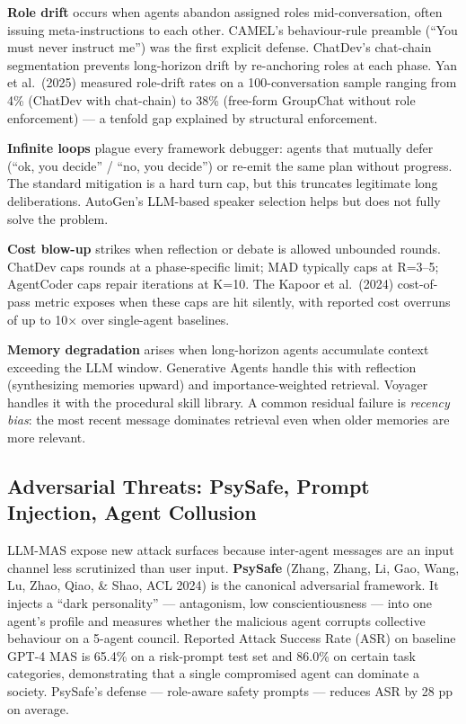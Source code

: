 \textbf{Role drift} occurs when agents abandon assigned roles mid-conversation, often issuing meta-instructions to each other. CAMEL's behaviour-rule preamble (``You must never instruct me'') was the first explicit defense. ChatDev's chat-chain segmentation prevents long-horizon drift by re-anchoring roles at each phase. Yan et al.~(2025) measured role-drift rates on a 100-conversation sample ranging from 4\% (ChatDev with chat-chain) to 38\% (free-form GroupChat without role enforcement) --- a tenfold gap explained by structural enforcement.

\textbf{Infinite loops} plague every framework debugger: agents that mutually defer (``ok, you decide'' / ``no, you decide'') or re-emit the same plan without progress. The standard mitigation is a hard turn cap, but this truncates legitimate long deliberations. AutoGen's LLM-based speaker selection helps but does not fully solve the problem.

\textbf{Cost blow-up} strikes when reflection or debate is allowed unbounded rounds. ChatDev caps rounds at a phase-specific limit; MAD typically caps at R=3--5; AgentCoder caps repair iterations at K=10. The Kapoor et al.~(2024) cost-of-pass metric exposes when these caps are hit silently, with reported cost overruns of up to 10× over single-agent baselines.

\textbf{Memory degradation} arises when long-horizon agents accumulate context exceeding the LLM window. Generative Agents handle this with reflection (synthesizing memories upward) and importance-weighted retrieval. Voyager handles it with the procedural skill library. A common residual failure is \emph{recency bias}: the most recent message dominates retrieval even when older memories are more relevant.

\subsection{Adversarial Threats: PsySafe, Prompt Injection, Agent Collusion}\label{adversarial-threats-psysafe-prompt-injection-agent-collusion}

LLM-MAS expose new attack surfaces because inter-agent messages are an input channel less scrutinized than user input. \textbf{PsySafe} (Zhang, Zhang, Li, Gao, Wang, Lu, Zhao, Qiao, \& Shao, ACL 2024) is the canonical adversarial framework. It injects a ``dark personality'' --- antagonism, low conscientiousness --- into one agent's profile and measures whether the malicious agent corrupts collective behaviour on a 5-agent council. Reported Attack Success Rate (ASR) on baseline GPT-4 MAS is 65.4\% on a risk-prompt test set and 86.0\% on certain task categories, demonstrating that a single compromised agent can dominate a society. PsySafe's defense --- role-aware safety prompts --- reduces ASR by 28 pp on average.

